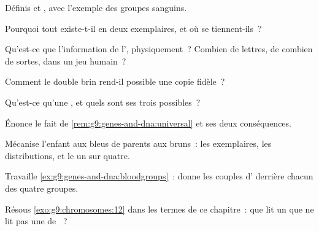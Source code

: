 \begin{exercise}[$\star$]\label{exo:g9:genes-and-dna:1}
Définis  et , avec l'exemple des groupes sanguins.
\end{exercise}

\begin{exercise}[$\star$]\label{exo:g9:genes-and-dna:2}
Pourquoi tout  existe-t-il en deux exemplaires, et où
se tiennent-ils~?
\end{exercise}

\begin{exercise}[$\star$]\label{exo:g9:genes-and-dna:3}
Qu'est-ce que l'information de l', physiquement~?
Combien de lettres, de combien de sortes, dans un jeu
humain~?
\end{exercise}

\begin{exercise}[$\star$]\label{exo:g9:genes-and-dna:4}
Comment le double brin rend-il possible une copie fidèle~?
\end{exercise}

\begin{exercise}[$\star$]\label{exo:g9:genes-and-dna:5}
Qu'est-ce qu'une , et quels sont ses trois
 possibles~?
\end{exercise}

\begin{exercise}[$\star$]\label{exo:g9:genes-and-dna:6}
Énonce le fait de \cref{rem:g9:genes-and-dna:universal} et
ses deux conséquences.
\end{exercise}

\begin{exercise}[$\star\star$]\label{exo:g9:genes-and-dna:7}
Mécanise l'enfant aux  bleus de parents aux 
bruns~: les exemplaires, les distributions, et le un sur
quatre.
\end{exercise}

\begin{exercise}[$\star\star$]\label{exo:g9:genes-and-dna:8}
Travaille \cref{ex:g9:genes-and-dna:bloodgroups}~: donne
les couples d' derrière chacun des quatre groupes.
\end{exercise}

\begin{exercise}[$\star\star$]\label{exo:g9:genes-and-dna:9}
Résous \cref{exo:g9:chromosomes:12} dans les termes de ce
chapitre~: que lit un  que ne lit pas une  de
~?
\end{exercise}


